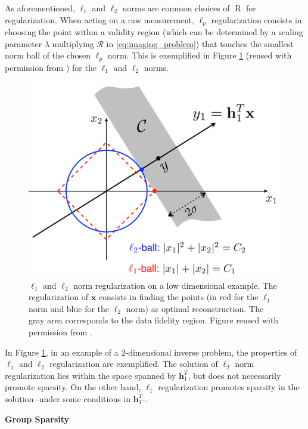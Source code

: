 As aforementioned, $\ell_1$ and $\ell_2$ norms are common choices of $\operatorname{R}$ for regularization. When acting on a raw measurement, $\ell_p$ regularization consists in choosing the point within a validity region (which can be determined by a scaling parameter $\lambda$ multiplying $\mathcal{R}$ in \eqref{eq:imaging_problem}) that touches the smallest norm ball of the chosen $\ell_p$ norm. This is exemplified in Figure \ref{fig:l1_reg} (reused with permission from \cite{noauthor_tutorial_2020}) for the $\ell_1$ and $\ell_2$ norms.  
\begin{figure}[H]
  \begin{center}
  \includegraphics[width = 0.55
  \textwidth]{images/l1_reg.PNG}
  \caption{$\ell_1$ and $\ell_2$ norm regularization on a low dimensional example. The regularization of $\mathbf{x}$ consists in finding the points (in red for the $\ell_1$ norm and blue for the $\ell_2$ norm) as optimal reconstruction. The gray area corresponds to the data fidelity region. Figure reused with permission from \cite{noauthor_tutorial_2020}.}
  \label{fig:l1_reg}
  \end{center}
\end{figure}

In Figure \ref{fig:l1_reg}, in an example of a $2$-dimensional inverse problem, the properties of $\ell_1$ and $\ell_2$ regularization are exemplified. The solution of $\ell_2$ norm regularization lies within the space spanned by $\mathbf{h}_1^T$, but does not necessarily promote sparsity. On the other hand, $\ell_1$ regularization promotes sparsity in the solution -under some conditions in $\mathbf{h}_1^T$-.

\noindent\textbf{Group Sparsity}

